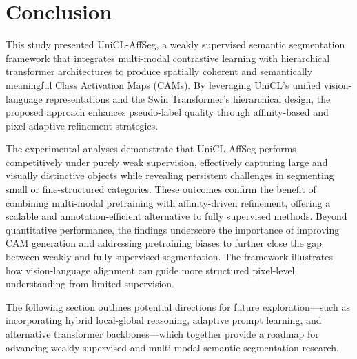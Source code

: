 \chapter{Conclusion}
\label{chap:conclusion}

This study presented UniCL-AffSeg, a weakly supervised semantic segmentation framework that integrates multi-modal contrastive learning with hierarchical transformer architectures to produce spatially coherent and semantically meaningful Class Activation Maps (CAMs). By leveraging UniCL’s unified vision-language representations and the Swin Transformer’s hierarchical design, the proposed approach enhances pseudo-label quality through affinity-based and pixel-adaptive refinement strategies.

The experimental analyses demonstrate that UniCL-AffSeg performs competitively under purely weak supervision, effectively capturing large and visually distinctive objects while revealing persistent challenges in segmenting small or fine-structured categories. These outcomes confirm the benefit of combining multi-modal pretraining with affinity-driven refinement, offering a scalable and annotation-efficient alternative to fully supervised methods. Beyond quantitative performance, the findings underscore the importance of improving CAM generation and addressing pretraining biases to further close the gap between weakly and fully supervised segmentation. The framework illustrates how vision-language alignment can guide more structured pixel-level understanding from limited supervision.

The following section outlines potential directions for future exploration—such as incorporating hybrid local-global reasoning, adaptive prompt learning, and alternative transformer backbones—which together provide a roadmap for advancing weakly supervised and multi-modal semantic segmentation research.


